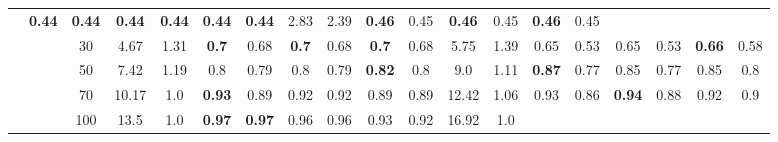 \documentclass[letterpaper]{article}
\begin{document}
\begin{table*}[]
\begin{tabular}{ccccccccccccccccccc}
 & \textbf{0.44}
 & \textbf{0.44}
 & \textbf{0.44}
 & \textbf{0.44}
 & \textbf{0.44}
 & \textbf{0.44} & 2.83 & 2.39

 & \textbf{0.46}
 & 0.45
 & \textbf{0.46}
 & 0.45
 & \textbf{0.46}
 & 0.45
\\ & & 30 & 4.67 & 1.31

 & \textbf{0.7}
 & 0.68
 & \textbf{0.7}
 & 0.68
 & \textbf{0.7}
 & 0.68 & 5.75 & 1.39

 & 0.65
 & 0.53
 & 0.65
 & 0.53
 & \textbf{0.66}
 & 0.58
\\ & & 50 & 7.42 & 1.19

 & 0.8
 & 0.79
 & 0.8
 & 0.79
 & \textbf{0.82}
 & 0.8 & 9.0 & 1.11

 & \textbf{0.87}
 & 0.77
 & 0.85
 & 0.77
 & 0.85
 & 0.8
\\ & & 70 & 10.17 & 1.0

 & \textbf{0.93}
 & 0.89
 & 0.92
 & 0.92
 & 0.89
 & 0.89 & 12.42 & 1.06

 & 0.93
 & 0.86
 & \textbf{0.94}
 & 0.88
 & 0.92
 & 0.9
\\ & & 100 & 13.5 & 1.0

 & \textbf{0.97}
 & \textbf{0.97}
 & 0.96
 & 0.96
 & 0.93
 & 0.92 & 16.92 & 1.0


\end{tabular}
\end{table*}
\end{document}
